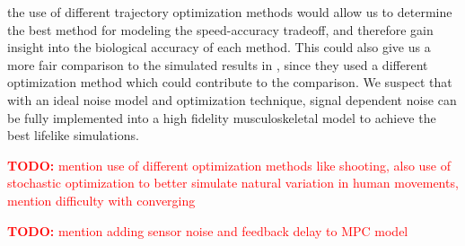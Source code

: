 \documentclass[letterpaper, 10pt, conference]{ieeeconf}
\newcommand{\todo}[1]{\textcolor{red}{\textbf{TODO:} #1}}
\begin{document}
the use of different trajectory optimization methods would allow us to determine the best method for modeling the speed-accuracy tradeoff, and therefore gain insight into the biological accuracy of each method. This could also give us a more fair comparison to the simulated results in \cite{original_paper_high_fidelity}, since they used a different optimization method which could contribute to the comparison. We suspect that with an ideal noise model and optimization technique, signal dependent noise can be fully implemented into a high fidelity musculoskeletal model to achieve the best lifelike simulations.

\todo{mention use of different optimization methods like shooting, also use of stochastic optimization to better simulate natural variation in human movements, mention difficulty with converging}

\todo{mention adding sensor noise and feedback delay to MPC model}
\end{document}

